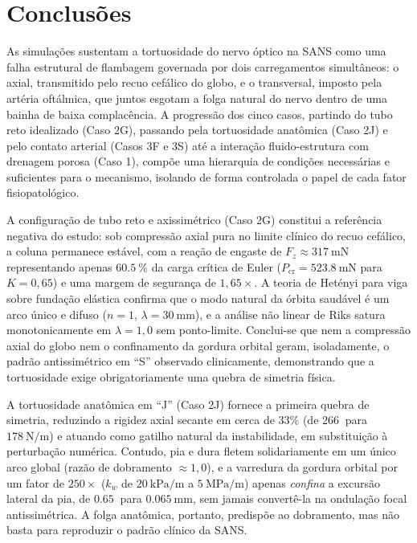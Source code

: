 \documentclass[12pt,a4paper]{article}
\begin{document}
\section*{Conclusões}
\label{sec:conclusoes}

As simulações sustentam a tortuosidade do nervo óptico na SANS como uma falha estrutural de flambagem governada por dois carregamentos simultâneos: o axial, transmitido pelo recuo cefálico do globo, e o transversal, imposto pela artéria oftálmica, que juntos esgotam a folga natural do nervo dentro de uma bainha de baixa complacência. A progressão dos cinco casos, partindo do tubo reto idealizado (Caso 2G), passando pela tortuosidade anatômica (Caso 2J) e pelo contato arterial (Casos 3F e 3S) até a interação fluido-estrutura com drenagem porosa (Caso 1), compõe uma hierarquia de condições necessárias e suficientes para o mecanismo, isolando de forma controlada o papel de cada fator fisiopatológico.

A configuração de tubo reto e axissimétrico (Caso 2G) constitui a referência negativa do estudo: sob compressão axial pura no limite clínico do recuo cefálico, a coluna permanece estável, com a reação de engaste de $F_z \approx \SI{317}{\milli\newton}$ representando apenas $\SI{60,5}{\%}$ da carga crítica de Euler ($P_{\mathrm{cr}} = \SI{523,8}{\milli\newton}$ para $K = 0{,}65$) e uma margem de segurança de $1{,}65\times$. A teoria de Hetényi para viga sobre fundação elástica confirma que o modo natural da órbita saudável é um arco único e difuso ($n = 1$, $\lambda = \SI{30}{\milli\meter}$), e a análise não linear de Riks satura monotonicamente em $\lambda = 1{,}0$ sem ponto-limite. Conclui-se que nem a compressão axial do globo nem o confinamento da gordura orbital geram, isoladamente, o padrão antissimétrico em ``S'' observado clinicamente, demonstrando que a tortuosidade exige obrigatoriamente uma quebra de simetria física.

A tortuosidade anatômica em ``J'' (Caso 2J) fornece a primeira quebra de simetria, reduzindo a rigidez axial secante em cerca de $33\%$ (de $\SI{266}{}$ para $\SI{178}{\newton\per\meter}$) e atuando como gatilho natural da instabilidade, em substituição à perturbação numérica. Contudo, pia e dura fletem solidariamente em um único arco global (razão de dobramento $\approx 1{,}0$), e a varredura da gordura orbital por um fator de $250\times$ ($k_w$ de $\SI{20}{\kilo\pascal\per\meter}$ a $\SI{5}{\mega\pascal\per\meter}$) apenas \emph{confina} a excursão lateral da pia, de $\SI{0,65}{}$ para $\SI{0,065}{\milli\meter}$, sem jamais convertê-la na ondulação focal antissimétrica. A folga anatômica, portanto, predispõe ao dobramento, mas não basta para reproduzir o padrão clínico da SANS.
\end{document}
